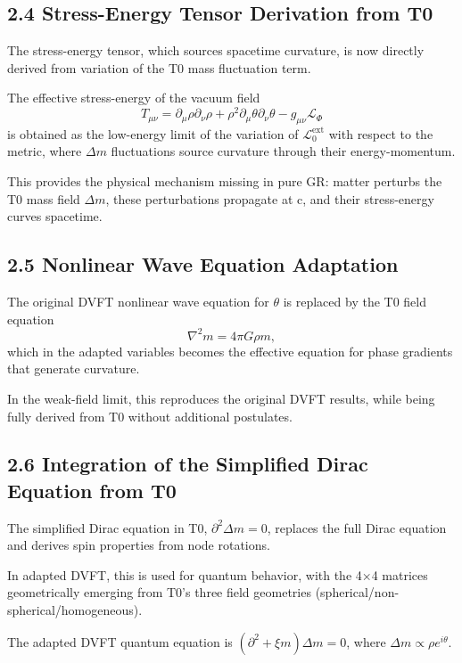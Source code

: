 \documentclass[12pt,a4paper]{article}
\begin{document}
	\subsection{2.4 Stress-Energy Tensor Derivation from T0}
	
	The stress-energy tensor, which sources spacetime curvature, is now directly derived from variation of the T0 mass fluctuation term.
	
	The effective stress-energy of the vacuum field
	\[
	T_{\mu\nu} = \partial_\mu \rho \partial_\nu \rho + \rho^2 \partial_\mu \theta \partial_\nu \theta - g_{\mu\nu} \mathcal{L}_{\Phi}
	\]
	is obtained as the low-energy limit of the variation of $\mathcal{L}_0^{\text{ext}}$ with respect to the metric, where $\Delta m$ fluctuations source curvature through their energy-momentum.
	
	This provides the physical mechanism missing in pure GR: matter perturbs the T0 mass field $\Delta m$, these perturbations propagate at c, and their stress-energy curves spacetime.
	
	\subsection{2.5 Nonlinear Wave Equation Adaptation}
	
	The original DVFT nonlinear wave equation for $\theta$ is replaced by the T0 field equation
	\[
	\nabla^2 m = 4\pi G \rho m,
	\]
	which in the adapted variables becomes the effective equation for phase gradients that generate curvature.
	
	In the weak-field limit, this reproduces the original DVFT results, while being fully derived from T0 without additional postulates.
	
	\subsection{2.6 Integration of the Simplified Dirac Equation from T0}
	
	The simplified Dirac equation in T0, $\partial^2 \Delta m = 0$, replaces the full Dirac equation and derives spin properties from node rotations.
	
	In adapted DVFT, this is used for quantum behavior, with the 4×4 matrices geometrically emerging from T0's three field geometries (spherical/non-spherical/homogeneous).
	
	The adapted DVFT quantum equation is $(\partial^2 + \xi m) \Delta m = 0$, where $\Delta m \propto \rho e^{i\theta}$.
	
\end{document}
